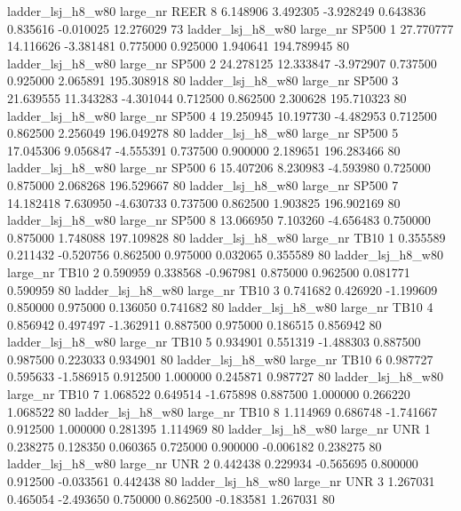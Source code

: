   ladder_lsj_h8_w80   large_nr     REER                 8  6.148906  3.492305  -3.928249 0.643836 0.835616 -0.010025   12.276029 73
  ladder_lsj_h8_w80   large_nr    SP500                 1 27.770777 14.116626  -3.381481 0.775000 0.925000  1.940641  194.789945 80
  ladder_lsj_h8_w80   large_nr    SP500                 2 24.278125 12.333847  -3.972907 0.737500 0.925000  2.065891  195.308918 80
  ladder_lsj_h8_w80   large_nr    SP500                 3 21.639555 11.343283  -4.301044 0.712500 0.862500  2.300628  195.710323 80
  ladder_lsj_h8_w80   large_nr    SP500                 4 19.250945 10.197730  -4.482953 0.712500 0.862500  2.256049  196.049278 80
  ladder_lsj_h8_w80   large_nr    SP500                 5 17.045306  9.056847  -4.555391 0.737500 0.900000  2.189651  196.283466 80
  ladder_lsj_h8_w80   large_nr    SP500                 6 15.407206  8.230983  -4.593980 0.725000 0.875000  2.068268  196.529667 80
  ladder_lsj_h8_w80   large_nr    SP500                 7 14.182418  7.630950  -4.630733 0.737500 0.862500  1.903825  196.902169 80
  ladder_lsj_h8_w80   large_nr    SP500                 8 13.066950  7.103260  -4.656483 0.750000 0.875000  1.748088  197.109828 80
  ladder_lsj_h8_w80   large_nr     TB10                 1  0.355589  0.211432  -0.520756 0.862500 0.975000  0.032065    0.355589 80
  ladder_lsj_h8_w80   large_nr     TB10                 2  0.590959  0.338568  -0.967981 0.875000 0.962500  0.081771    0.590959 80
  ladder_lsj_h8_w80   large_nr     TB10                 3  0.741682  0.426920  -1.199609 0.850000 0.975000  0.136050    0.741682 80
  ladder_lsj_h8_w80   large_nr     TB10                 4  0.856942  0.497497  -1.362911 0.887500 0.975000  0.186515    0.856942 80
  ladder_lsj_h8_w80   large_nr     TB10                 5  0.934901  0.551319  -1.488303 0.887500 0.987500  0.223033    0.934901 80
  ladder_lsj_h8_w80   large_nr     TB10                 6  0.987727  0.595633  -1.586915 0.912500 1.000000  0.245871    0.987727 80
  ladder_lsj_h8_w80   large_nr     TB10                 7  1.068522  0.649514  -1.675898 0.887500 1.000000  0.266220    1.068522 80
  ladder_lsj_h8_w80   large_nr     TB10                 8  1.114969  0.686748  -1.741667 0.912500 1.000000  0.281395    1.114969 80
  ladder_lsj_h8_w80   large_nr      UNR                 1  0.238275  0.128350   0.060365 0.725000 0.900000 -0.006182    0.238275 80
  ladder_lsj_h8_w80   large_nr      UNR                 2  0.442438  0.229934  -0.565695 0.800000 0.912500 -0.033561    0.442438 80
  ladder_lsj_h8_w80   large_nr      UNR                 3  1.267031  0.465054  -2.493650 0.750000 0.862500 -0.183581    1.267031 80

